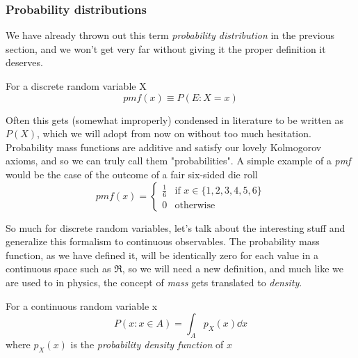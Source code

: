 \subsubsection{Probability distributions}
\label{subsubsec:pdf}

We have already thrown out this term \emph{probability distribution} in the previous section, and we won't get very far without giving it the proper definition it deserves. 

\begin{definition}
	For a discrete random variable X
	\[
	pmf(x)\equiv P(E:X=x)
	\]
\end{definition}

Often this gets (somewhat improperly) condensed in literature to be written as $P(X)$, which we will adopt from now on without too much hesitation. Probability mass functions are additive and satisfy our lovely Kolmogorov axioms, and so we can truly call them "probabilities". A simple example of a \emph{pmf} would be the case of the outcome of a fair six-sided die roll
	\[
	pmf(x) = \begin{cases} \frac{1}{6} & \text{if } x \in \{1,2,3,4,5,6\} \\ 0 &  \text{otherwise} \end{cases}
	\]


So much for discrete random variables, let's talk about the interesting stuff and generalize this formalism to continuous observables. The probability mass function, as we have defined it, will be identically zero for each value in a continuous space such as $\Re$, so we will need a new definition, and much like we are used to in physics, the concept of \emph{mass} gets translated to \emph{density}.

\begin{definition}
	For a continuous random variable x
	\[
	P(x:x\in A)= \int_{A} p_X(x)\dd x
	\]
	where $p_X(x)$ is the \emph{probability density function} of $x$ 
\end{definition}

